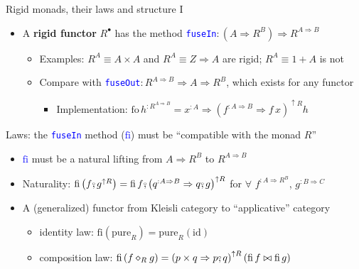 \documentclass[english]{beamer}
\newcommand{\bef}{\ensuremath\raisebox{2pt}{$\mathsmaller{\mathsmaller{\circ}}$}\hspace{-3.3pt},}
\begin{document}
\begin{frame}{Rigid monads, their laws and structure I}

\begin{itemize}
\item {\footnotesize{}\vspace{-0.2cm}}A \textbf{rigid functor} $R^{\bullet}$
has the method \texttt{\textcolor{blue}{\footnotesize{}fuseIn}}$:\left(A\Rightarrow R^{B}\right)\Rightarrow R^{A\Rightarrow B}$
\begin{itemize}
\item Examples: $R^{A}\equiv A\times A$ and $R^{A}\equiv Z\Rightarrow A$
are rigid; $R^{A}\equiv1+A$ is not
\item Compare with \texttt{\textcolor{blue}{\footnotesize{}fuseOut}}$:R^{A\Rightarrow B}\Rightarrow A\Rightarrow R^{B}$,
which exists for any functor
\begin{itemize}
\item {\footnotesize{}\vspace{-0.3cm}}Implementation: $\text{fo}\,h^{:R^{A\Rightarrow B}}=x^{:A}\Rightarrow\left(f^{:A\Rightarrow B}\Rightarrow f\,x\right)^{\uparrow R}h$
\end{itemize}
\end{itemize}
\end{itemize}
{\footnotesize{}\vspace{-0.15cm}}Laws: the \texttt{\textcolor{blue}{\footnotesize{}fuseIn}}
method (\texttt{\textcolor{blue}{\footnotesize{}$\text{fi}$}}) must
be ``compatible with the monad $R$''
\begin{itemize}
\item {\footnotesize{}\vspace{-0.05cm}}\texttt{\textcolor{blue}{\footnotesize{}$\text{fi}$}}
must be a natural lifting from $A\Rightarrow R^{B}$ to $R^{A\Rightarrow B}$
\item Naturality: $\text{fi}\left(f\bef g^{\uparrow R}\right)=\text{fi}\,f\bef\left(q^{:A\Rightarrow B}\Rightarrow q\bef g\right)^{\uparrow R}$
for $\forall$ $f^{:A\Rightarrow R^{B}}$, $g^{:B\Rightarrow C}$
\item A (generalized) functor from Kleisli category to ``applicative''
category
\begin{itemize}
\item identity law: $\text{fi}\left(\text{pure}_{R}\right)=\text{pure}_{R}\left(\text{id}\right)$
\item composition law: $\text{fi}\left(f\diamond_{R}g\right)=\left(p\times q\Rightarrow p\bef q\right)^{\uparrow R}\left(\text{fi}\,f\bowtie\text{fi}\,g\right)${\footnotesize{}\vspace{-0.3cm}}{\small{}
}
\end{itemize}
\end{itemize}
\end{frame}
\end{document}
